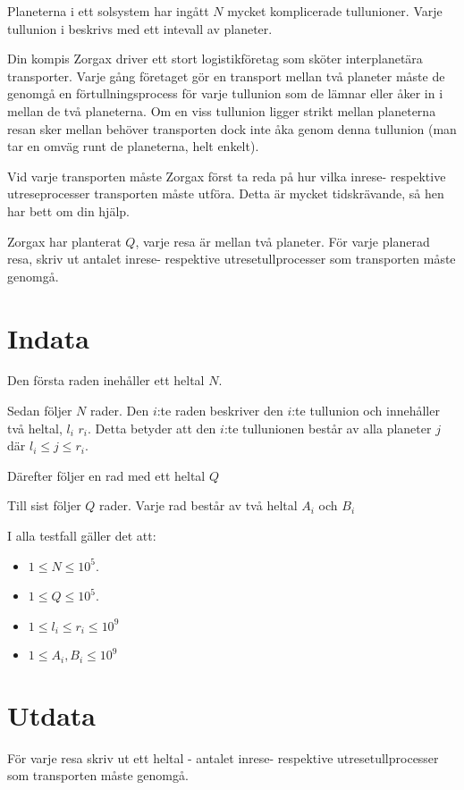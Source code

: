 
Planeterna i ett solsystem har ingått $N$ mycket komplicerade tullunioner. Varje tullunion i beskrivs med ett intevall av planeter.

Din kompis Zorgax driver ett stort logistikföretag som sköter interplanetära transporter. Varje gång företaget gör en transport mellan två planeter måste de genomgå en förtullningsprocess för varje tullunion som de lämnar eller åker in i mellan de två planeterna. Om en viss tullunion ligger strikt mellan planeterna resan sker mellan behöver transporten dock inte åka genom denna tullunion (man tar en omväg runt de planeterna, helt enkelt).

Vid varje transporten måste Zorgax först ta reda på hur vilka inrese- respektive utreseprocesser transporten måste utföra. Detta är mycket tidskrävande, så hen har bett om din hjälp.

Zorgax har planterat $Q$, varje resa är mellan två planeter. För varje planerad resa,  skriv ut antalet inrese- respektive utresetullprocesser som transporten måste genomgå. 


\section*{Indata}
Den första raden inehåller ett heltal $N$.

Sedan följer $N$ rader. Den $i$:te raden beskriver den $i$:te tullunion och innehåller två heltal, $l_i$ $r_i$. Detta betyder att den $i$:te tullunionen består av alla planeter $j$ där $l_i \leq j \leq r_i$.

Därefter följer en rad med ett heltal $Q$

Till sist följer $Q$ rader. Varje rad består av två heltal $A_i$ och $B_i$

I alla testfall gäller det att:
\begin{itemize}
  \item $1 \le N \le 10^5$.
  \item $1 \le Q \le 10^5$.
  \item $1\leq l_i \leq r_i \leq 10^9$
  \item $1 \leq A_i, B_i \leq 10^9$
\end{itemize}

\section*{Utdata}
För varje resa skriv ut ett heltal - antalet inrese- respektive utresetullprocesser som transporten måste genomgå.

